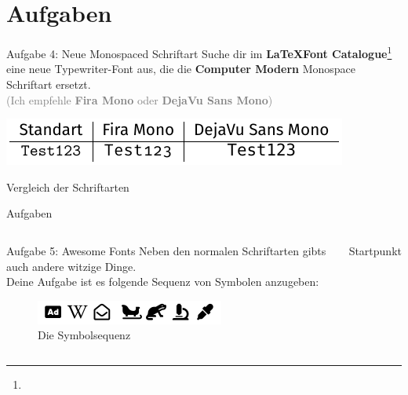 \documentclass[14pt,aspectratio=169]{beamer}
\begin{document}

\section*{Aufgaben}
\sectionframe


\begin{frame}{\insertsection}
    \begin{alertblock}{Aufgabe 4: \quad Neue Monospaced Schriftart}
        Suche dir im \textbf{\LaTeX  Font Catalogue}\footnote{\fontcalatogue} eine neue
        Typewriter-Font aus, die die \textbf{Computer Modern} Monospace Schriftart
        ersetzt. \\
        \textcolor{gray}{(Ich empfehle \textbf{Fira Mono} oder \textbf{DejaVu Sans Mono})}
        
        \begin{table}
            \includegraphics[width=.6\textwidth]{pictures/monospaced.pdf}
            \caption{Vergleich der Schriftarten}
        \end{table}
        
    \end{alertblock}
\end{frame}


\begin{frame}{Aufgaben}
    \begin{columns}
            
        \begin{alertblock}{Aufgabe 5: \quad Awesome Fonts \small\faGrinHearts[regular]}
            Neben den normalen Schriftarten gibts auch andere witzige Dinge.\\[1em]        
            Deine Aufgabe ist es folgende Sequenz von Symbolen anzugeben:
            
            \begin{figure}
                \includegraphics[width=.9\textwidth]{pictures/awesome.pdf}
                \caption{Die Symbolsequenz}
            \end{figure}
        
            \vspace{-1em}
        \end{alertblock}
            
            
        \centering
        \large Startpunkt
        \material[height=.7\textwidth]{\ctanFontAwesome}
    \end{columns}
\end{frame}
\end{document}
